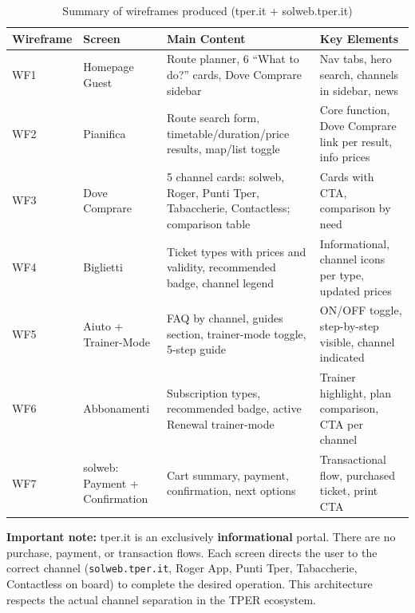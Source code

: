 ﻿\documentclass[11pt,a4paper]{article}
\begin{document}
\begin{table}[H]
\centering
\small
\renewcommand{\arraystretch}{1.25}
\begin{tabular}{|p{1.8cm}|p{2.8cm}|p{5.2cm}|p{5.2cm}|}
\hline
\textbf{Wireframe} & \textbf{Screen} & \textbf{Main Content} & \textbf{Key Elements} \\
\hline
WF1 & Homepage Guest & Route planner, 6 ``What to do?'' cards, Dove Comprare sidebar & Nav tabs, hero search, channels in sidebar, news \\
\hline
WF2 & Pianifica & Route search form, timetable/duration/price results, map/list toggle & Core function, Dove Comprare link per result, info prices \\
\hline
WF3 & Dove Comprare & 5 channel cards: solweb, Roger, Punti Tper, Tabaccherie, Contactless; comparison table & Cards with CTA, comparison by need \\
\hline
WF4 & Biglietti & Ticket types with prices and validity, recommended badge, channel legend & Informational, channel icons per type, updated prices \\
\hline
WF5 & Aiuto + Trainer-Mode & FAQ by channel, guides section, trainer-mode toggle, 5-step guide & ON/OFF toggle, step-by-step visible, channel indicated \\
\hline
WF6 & Abbonamenti & Subscription types, recommended badge, active Renewal trainer-mode & Trainer highlight, plan comparison, CTA per channel \\
\hline
WF7 & solweb: Payment + Confirmation & Cart summary, payment, confirmation, next options & Transactional flow, purchased ticket, print CTA \\
\hline
\end{tabular}
\caption{Summary of wireframes produced (tper.it + solweb.tper.it)}
\label{tab:wfsum}
\end{table}

\vspace{0.2cm}

\begin{tcolorbox}[summarybox]
\small
\textbf{Important note:} tper.it is an exclusively \textbf{informational} portal. There are no purchase, payment, or transaction flows. Each screen directs the user to the correct channel (\texttt{solweb.tper.it}, Roger App, Punti Tper, Tabaccherie, Contactless on board) to complete the desired operation. This architecture respects the actual channel separation in the TPER ecosystem.
\end{tcolorbox}

\end{document}
